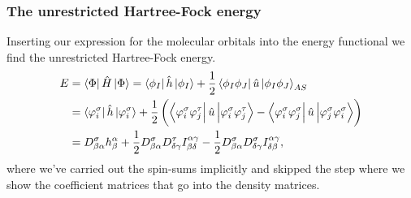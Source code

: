             \subsubsection{The unrestricted Hartree-Fock energy}
                Inserting our expression for the molecular orbitals into the
                energy functional we find the unrestricted Hartree-Fock energy.
                \begin{align}
                    E
                    &=
                    \bra{\Phi}\hat{H}\ket{\Phi}
                    =
                    \bra{\phi_I}\hat{h}\ket{\phi_I}
                    +
                    \frac{1}{2}
                    \bra{\phi_I\phi_J}
                    \hat{u}
                    \ket{\phi_I\phi_J}_{AS}
                    \\
                    &=
                    \bra{\varphi^{\sigma}_{i}}
                    \hat{h}
                    \ket{\varphi^{\sigma}_{i}}
                    + \frac{1}{2}\left( 
                        \bra{\varphi^{\sigma}_{i}\varphi^{\tau}_{j}}
                        \hat{u}
                        \ket{\varphi^{\sigma}_{i}\varphi^{\tau}_{j}}
                        -
                        \bra{\varphi^{\sigma}_{i}\varphi^{\sigma}_{j}}
                        \hat{u}
                        \ket{\varphi^{\sigma}_{j}\varphi^{\sigma}_{i}}
                     \right)
                    \\
                    &=
                    D^{\sigma}_{\beta\alpha}
                    h^{\alpha}_{\beta}
                    + \frac{1}{2}
                    D^{\sigma}_{\beta\alpha}
                    D^{\tau}_{\delta\gamma}
                    I^{\alpha\gamma}_{\beta\delta}
                    - \frac{1}{2}
                    D^{\sigma}_{\beta\alpha}
                    D^{\sigma}_{\delta\gamma}
                    I^{\alpha\gamma}_{\delta\beta},
                \end{align}
                where we've carried out the spin-sums implicitly and skipped the
                step where we show the coefficient matrices that go into the
                density matrices.



